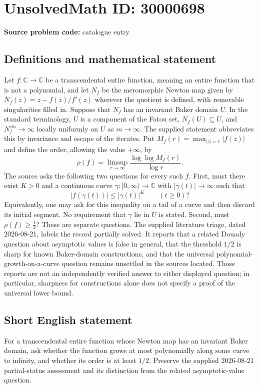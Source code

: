 \documentclass[11pt]{article}
\newcommand{\C}{\mathbb{C}}
\begin{document}
\section*{UnsolvedMath ID: 30000698}
\textbf{Source problem code:} catalogue entry
\subsection{Definitions and mathematical statement}
Let $f:\C\to\C$ be a transcendental entire function, meaning an entire function that is not a polynomial, and let $N_f$ be the meromorphic Newton map given by $N_f(z)=z-f(z)/f'(z)$ wherever the quotient is defined, with removable singularities filled in. Suppose that $N_f$ has an invariant Baker domain $U$. In the standard terminology, $U$ is a component of the Fatou set, $N_f(U)\subseteq U$, and $N_f^{\circ m}\to\infty$ locally uniformly on $U$ as $m\to\infty$. The supplied statement abbreviates this by invariance and escape of the iterates. Put $M_f(r)=\max_{|z|=r}|f(z)|$ and define the order, allowing the value $+\infty$, by \[\rho(f)=\limsup_{r\to\infty}\frac{\log\log M_f(r)}{\log r}.\] The source asks the following two questions for every such $f$. First, must there exist $K>0$ and a continuous curve $\gamma:[0,\infty)\to\C$ with $|\gamma(t)|\to\infty$ such that \[|f(\gamma(t))|\leq |\gamma(t)|^K\qquad(t\geq0)?\] Equivalently, one may ask for this inequality on a tail of a curve and then discard its initial segment. No requirement that $\gamma$ lie in $U$ is stated. Second, must $\rho(f)\geq\tfrac12$? These are separate questions. The supplied literature triage, dated 2026-08-21, labels the record partially solved. It reports that a related Douady question about asymptotic values is false in general, that the threshold $1/2$ is sharp for known Baker-domain constructions, and that the universal polynomial-growth-on-a-curve question remains unsettled in the sources located. Those reports are not an independently verified answer to either displayed question; in particular, sharpness for constructions alone does not specify a proof of the universal lower bound.
\subsection{Short English statement}
For a transcendental entire function whose Newton map has an invariant Baker domain, ask whether the function grows at most polynomially along some curve to infinity, and whether its order is at least $1/2$. Preserve the supplied 2026-08-21 partial-status assessment and its distinction from the related asymptotic-value question.
\end{document}
